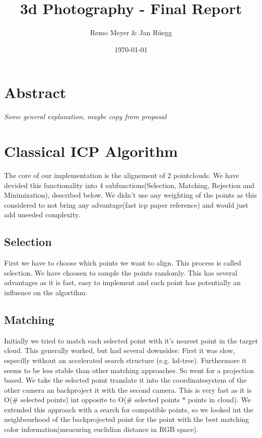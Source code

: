 \documentclass[twocolumn]{article}
\title{3d Photography - Final Report}
\author{Remo Meyer \& Jan Rüegg}
\date{\today}
\begin{document}
\maketitle

\section{Abstract}
\textit{Some general explanation, maybe copy from proposal}

\section{Classical ICP Algorithm}
\cite{fasticp}

The core of our implementation is the alignement of 2 pointclouds. 
We have devided this functionality into 4 subfunctions(Selection, Matching, Rejection and Minimization), described below. 
We didn't use any weighting of the points as this considered to not bring any advantage(fast icp paper reference) and would just add uneeded complexity.

\subsection{Selection}
First we have to choose which points we want to align. This process is called selection. 
We have choosen to sample the points randomly. 
This has several advantages as it is fast, easy to implement and each point has potentially an influence on the algortihm.

\subsection{Matching}
Initially we tried to match each selected point with it's nearest point in the target cloud. 
This generally worked, but had several downsides: First it was slow, especilly without an accelerated search structure (e.g. kd-tree). 
Furthermore it seems to be less stable than other matching approaches. 
So went for a projection based. We take the selected point translate it into the coordinatesystem of the other camera an backproject it with the second camera.
This is very fast as it is O(\# selected points) int opposite to O(\# selected points * points in cloud). 
We extended this approach with a search for compatible points, so we looked int the neighbourhood of the backprojected point for the point with the best matching color information(measuring euclidian distance in RGB space).
\end{document}

